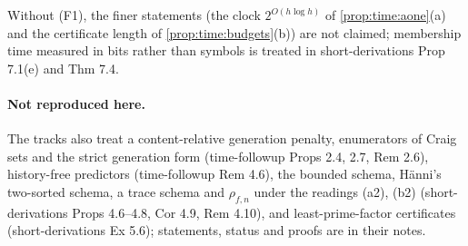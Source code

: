 \noindent Without (F1), the finer statements (the clock $2^{O(h\log h)}$ of \cref{prop:time:aone}(a) and the certificate length of \cref{prop:time:budgets}(b)) are not claimed; membership time measured in bits rather than symbols is treated in short-derivations Prop 7.1(e) and Thm 7.4.

\paragraph{Not reproduced here.} The tracks also treat a content-relative generation penalty, enumerators of Craig sets and the strict generation form (time-followup Props 2.4, 2.7, Rem 2.6), history-free predictors (time-followup Rem 4.6), the bounded schema, H\"anni's two-sorted schema, a trace schema and $\rho_{f,n}$ under the readings (a2), (b2) (short-derivations Props 4.6--4.8, Cor 4.9, Rem 4.10), and least-prime-factor certificates (short-derivations Ex 5.6); statements, status and proofs are in their notes.
